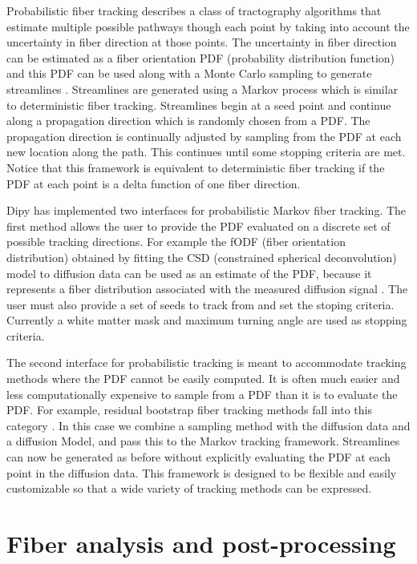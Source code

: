 \documentclass{bioinfo}
\begin{document}
Probabilistic fiber tracking describes a class of tractography algorithms that
estimate multiple possible pathways though each point by taking into
account the uncertainty in fiber direction at those points. The uncertainty in
fiber direction can be estimated as a fiber orientation PDF (probability distribution
function) and this PDF can be used along with a Monte Carlo sampling to
generate streamlines \citep{morris2008probabilistic}. Streamlines are generated using a
Markov process which is similar to deterministic fiber tracking. Streamlines begin
at a seed point and continue along a propagation direction which is randomly
chosen from a PDF. The propagation direction is continually adjusted by
sampling from the PDF at each new location along the path. This continues until
some stopping criteria are met. Notice that this framework is equivalent to
deterministic fiber tracking if the PDF at each point is a delta function of
one fiber direction.

Dipy has implemented two interfaces for probabilistic Markov fiber tracking. The
first method allows the user to provide the PDF evaluated on a discrete set of
possible tracking directions. For example the fODF (fiber orientation distribution)
obtained by fitting the CSD (constrained spherical deconvolution) model to diffusion
data can be used as an estimate of the PDF, because it represents a fiber distribution
associated with the measured diffusion signal \citep{jeurissen2011probabilistic}. The user must
also provide a set of seeds to track from and set the stoping criteria. Currently a white matter mask and maximum turning angle are used as stopping criteria.

The second interface for probabilistic tracking is meant to accommodate	tracking
methods where the PDF cannot be easily computed. It is often much easier and less
computationally expensive to sample from a PDF than it is to evaluate the PDF. For
example, residual bootstrap fiber tracking methods fall into this category \citep{berman2008probabilistic}.
In this case we combine a sampling method with the diffusion data and a diffusion Model,
and pass this to the Markov tracking framework. Streamlines can now be generated
as before without explicitly evaluating the PDF at each
point in the diffusion data. This framework is designed to be flexible and easily
customizable so that a wide variety of tracking methods can be expressed.

\section{Fiber analysis and post-processing}\label{post_tracking}
\end{document}
